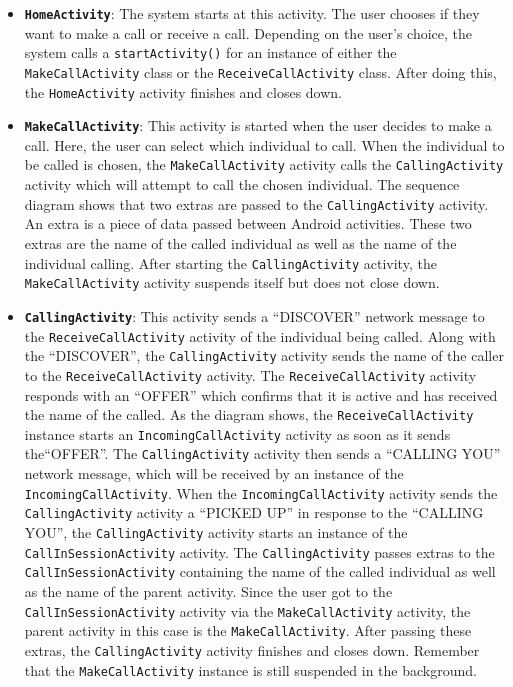 \documentclass[12pt,svgnames,smaller]{article} %
\begin{document}
		\begin{itemize}
			\item {\textbf{\texttt{HomeActivity}}}: The system starts at this activity. The user chooses if they want to make a call or receive a call. Depending on the user’s choice, the system calls a \texttt{startActivity()} for an instance of either the \texttt{MakeCallActivity} class or the \texttt{ReceiveCallActivity} class. After doing this, the \texttt{HomeActivity} activity finishes and closes down.
			\item \textbf{\texttt{MakeCallActivity}}: This activity is started when the user decides to make a call. Here, the user can select which individual to call. When the individual to be called is chosen, the \texttt{MakeCallActivity} activity calls the \texttt{CallingActivity} activity which will attempt to call the chosen individual. The sequence diagram shows that two extras are passed to the \texttt{CallingActivity} activity. An extra is a piece of data passed between Android activities. These two extras are the name of the called individual as well as the name of the individual calling. After starting the \texttt{CallingActivity} activity, the \texttt{MakeCallActivity} activity suspends itself but does not close down.
			\item \textbf{\texttt{CallingActivity}}: This activity sends a “DISCOVER” network message to the \texttt{ReceiveCallActivity} activity of the individual being called. Along with the “DISCOVER”, the \texttt{CallingActivity} activity sends the name of the caller to the \texttt{ReceiveCallActivity} activity. The \texttt{ReceiveCallActivity} activity responds with an “OFFER” which confirms that it is active and has received the name of the called. As the diagram shows, the \texttt{ReceiveCallActivity} instance starts an \texttt{IncomingCallActivity} activity as soon as it sends the“OFFER”. The \texttt{CallingActivity} activity then sends a “CALLING YOU” network message, which will be received by an instance of the \texttt{IncomingCallActivity}. When the \texttt{IncomingCallActivity} activity sends the \texttt{CallingActivity} activity a “PICKED UP” in response to the “CALLING YOU”, the \texttt{CallingActivity} activity starts an instance of the \texttt{CallInSessionActivity} activity. The \texttt{CallingActivity} passes extras to the \texttt{CallInSessionActivity} containing the name of the called individual as well as the name of the parent activity. Since the user got to the \texttt{CallInSessionActivity} activity via the \texttt{MakeCallActivity} activity, the parent activity in this case is the \texttt{MakeCallActivity}. After passing these extras, the \texttt{CallingActivity} activity finishes and closes down. Remember that the \texttt{MakeCallActivity} instance is still suspended in the background.

\end{itemize}
\end{document}
